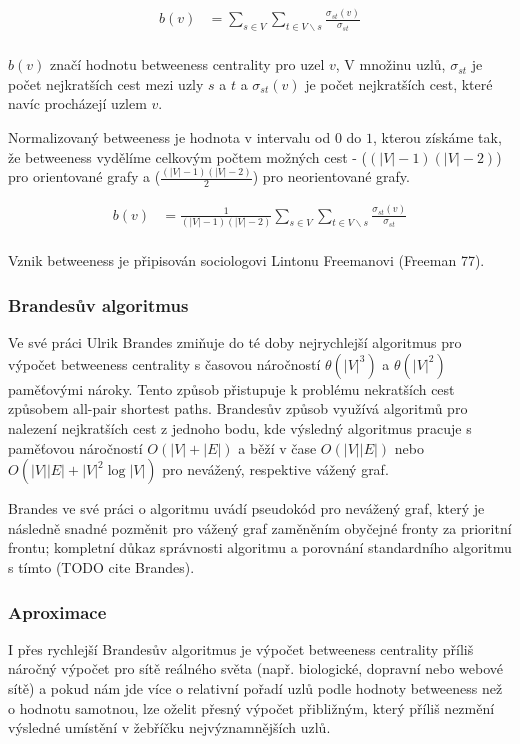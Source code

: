 \documentclass[12pt,titlepage]{report}
\begin{document}
\begin{align*}
b(v) &= \displaystyle\sum\limits_{s \in V} \displaystyle\sum\limits_{t \in V \backslash s} \frac{\sigma_{st}(v)}{\sigma_{st}} \\
\end{align*}

$b(v)$ značí hodnotu betweeness centrality pro uzel $v$, V množinu uzlů,
$\sigma_{st}$ je počet nejkratších cest mezi uzly $s$ a $t$ a $\sigma_{st}(v)$
je počet nejkratších cest, které navíc procházejí uzlem $v$.

Normalizovaný betweeness je hodnota v intervalu od $0$ do $1$, kterou získáme
tak, že betweeness vydělíme celkovým počtem možných cest - ($(|V| - 1)(|V| -
2)$) pro orientované grafy a ($\frac{(|V| - 1)(|V| - 2)}{2}$) pro neorientované
grafy.

\begin{align*}
b(v) &= \frac{1}{(|V| - 1)(|V| - 2)} \displaystyle\sum\limits_{s \in V} \displaystyle\sum\limits_{t \in V \backslash s} \frac{\sigma_{st}(v)}{\sigma_{st}} \\
\end{align*}

Vznik betweeness je připisován sociologovi Lintonu Freemanovi (Freeman 77).

\subsubsection{Brandesův algoritmus}
Ve své práci Ulrik Brandes zmiňuje do té doby nejrychlejší algoritmus pro
výpočet betweeness centrality s časovou náročností $\theta(|V|^3)$ a
$\theta(|V|^2)$ paměťovými nároky. Tento způsob přistupuje k problému
nekratších cest způsobem all-pair shortest paths. Brandesův způsob využívá
algoritmů pro nalezení nejkratších cest z jednoho bodu, kde výsledný algoritmus
pracuje s paměťovou náročností $O(|V| + |E|)$ a běží v čase $O(|V||E|)$ nebo
$O(|V||E| + |V|^2 \log|V|)$ pro nevážený, respektive vážený graf. 


Brandes ve
své práci o algoritmu uvádí pseudokód pro nevážený graf, který je následně
snadné pozměnit pro vážený graf zaměněním obyčejné fronty za prioritní frontu;
kompletní důkaz správnosti algoritmu a porovnání standardního algoritmu s tímto
(TODO cite Brandes).

\subsubsection{Aproximace}
I přes rychlejší Brandesův algoritmus je výpočet betweeness centrality příliš
náročný výpočet pro sítě reálného světa (např. biologické, dopravní nebo webové
sítě) a pokud nám jde více o relativní pořadí uzlů podle hodnoty betweeness než
o hodnotu samotnou, lze oželit přesný výpočet přibližným, který příliš nezmění
výsledné umístění v žebříčku nejvýznamnějších uzlů.
\end{document}
